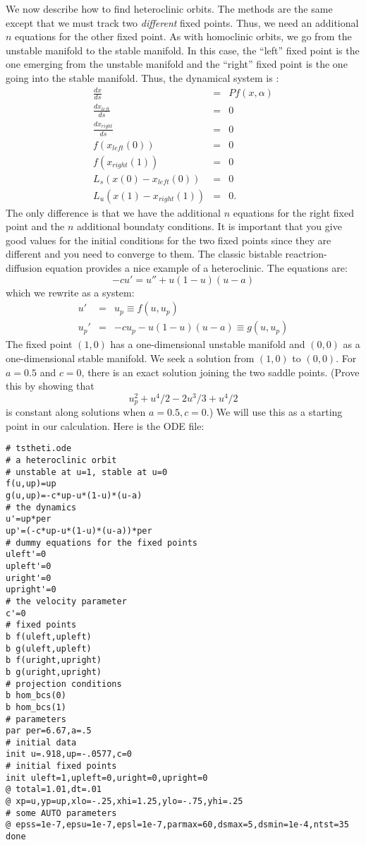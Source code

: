 \documentclass{article}
\begin{document}
We now describe how to find heteroclinic orbits. The methods are the
same except that we must track two {\em different} fixed points. Thus,
we need an additional $n$ equations for the other fixed point. As with
homoclinic orbits, we go from the unstable manifold to the stable
manifold. In this case, the ``left'' fixed point is the one emerging
from the unstable manifold and the ``right'' fixed point is the one
going into the stable manifold.  Thus, the dynamical system is :
\begin{eqnarray*}
\frac{dx}{ds} &=& P f(x,\alpha) \\
\frac{dx_{left}}{ds}&=& 0 \\
\frac{dx_{right}}{ds}&=& 0 \\
f(x_{left}(0)) &=& 0 \\
f(x_{right}(1)) &=& 0 \\
L_s (x(0)-x_{left}(0)) &=& 0 \\
L_u (x(1)-x_{right}(1)) &=& 0. 
\end{eqnarray*}    
The only difference is that we have the additional $n$ equations for
the right fixed point and the $n$ additional boundaty conditions.  It
is important that you give good values for the initial conditions for
the two fixed points since they are different and you need to converge
to them.  The classic bistable reactrion-diffusion equation provides a
nice example of a heteroclinic.  The equations are:
\[
-cu'=u''+u(1-u)(u-a)
\]
which we rewrite as a system:
\begin{eqnarray*}
u' &=& u_p \equiv f(u,u_p) \\
u_p' &=& -cu_p - u(1-u)(u-a) \equiv g(u,u_p)
\end{eqnarray*}
The fixed point $(1,0)$ has a one-dimensional unstable manifold and
$(0,0)$ as a one-dimensional stable manifold. We seek a solution from
$(1,0)$ to $(0,0).$  For $a=0.5$ and $c=0$, there is an exact solution
joining the two saddle points. (Prove this by showing that 
\[
u_p^2 +u^4/2-2u^3/3+u^4/2
\]
is constant along solutions when $a=0.5,c=0.$) We will use this as a
starting point in our calculation.
Here is the ODE file:
\begin{verbatim}
# tstheti.ode
# a heteroclinic orbit
# unstable at u=1, stable at u=0
f(u,up)=up
g(u,up)=-c*up-u*(1-u)*(u-a)
# the dynamics
u'=up*per
up'=(-c*up-u*(1-u)*(u-a))*per
# dummy equations for the fixed points
uleft'=0
upleft'=0
uright'=0
upright'=0
# the velocity parameter
c'=0
# fixed points
b f(uleft,upleft)
b g(uleft,upleft)
b f(uright,upright)
b g(uright,upright)
# projection conditions 
b hom_bcs(0)
b hom_bcs(1)
# parameters
par per=6.67,a=.5
# initial data
init u=.918,up=-.0577,c=0
# initial fixed points
init uleft=1,upleft=0,uright=0,upright=0
@ total=1.01,dt=.01
@ xp=u,yp=up,xlo=-.25,xhi=1.25,ylo=-.75,yhi=.25
# some AUTO parameters
@ epss=1e-7,epsu=1e-7,epsl=1e-7,parmax=60,dsmax=5,dsmin=1e-4,ntst=35
done
\end{verbatim}
\end{document}
